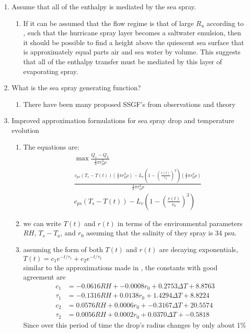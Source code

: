 \documentclass[10pt,a4paper]{article}
\begin{document}
 \renewcommand{\theenumi}{\Roman{enumi}}
 \renewcommand{\theenumii}{\arabic{enumii}}
 \renewcommand{\theenumiii}{\alpha{enumiii}}
 
 
\begin{enumerate}
\item
Assume that all of the enthalpy is mediated by the sea spray.
\begin{enumerate}
\item 
If it can be assumed that the flow regime is that of large $R_u$ according to \citet{Emanuel2003}, such that the hurricane spray layer becomes a saltwater emulsion, then it should be possible to find a height above the quiescent sea surface that is approximately equal parts air and sea water by volume. This suggests that all of the enthalpy transfer must be mediated by this layer of evaporating spray. 
\end{enumerate}
\item 
What is the sea spray generating function?
\begin{enumerate}
\item
There have been many proposed SSGF's from observations and theory
\end{enumerate}
\item 
Improved approximation formulations for sea spray drop and temperature evolution
\begin{enumerate}
\item The equations are:
\begin{align*}
&\max \frac{Q_s-Q_L}{\frac{4}{3}\pi r_0^3 \rho}\\
&\frac{c_{ps} (T_s-T(t))\left( \frac{4}{3}\pi r_0^3 \rho\right)-L_v \left(1-\left(\frac{r(t)}{r_0}\right)^3\right)\left( \frac{4}{3}\pi r_0^3 \rho\right)}{\frac{4}{3}\pi r_0^3 \rho}\\
&c_{ps} (T_s-T(t))-L_v \left(1-\left(\frac{r(t)}{r_0}\right)^3\right)
\end{align*}
\item we can write $T(t)$ and $r(t)$ in terms of the environmental parameters $RH$, $T_s-T_a$, and $r_0$ assuming that the salinity of they spray is 34 psu.
\item assuming the form of both $T(t)$ and $r(t)$ are decaying exponentials, \\
$T(t) = c_1e^{-t/\tau_1}+c_2e^{-t/\tau_2}$\\
similar to the approximations made in \citet{Andreas2005}, the constants with good agreement are
\begin{align}
 c_1 &=   -0.0616 RH  + -0.0008 r_0  + 0.2753 \Delta T +   8.8763\\
 \tau_1 &=   -0.1316 RH  +    0.0138 r_0  +    1.4294 \Delta T +    8.8224\\
 c_2 &=    0.0576 RH  +    0.0006 r_0  +   -0.3167 \Delta T +   20.5574\\
 \tau_2 &=     0.0056 RH  +    0.0002 r_0  +    0.0370 \Delta T +  -0.5818
\end{align}
Since over this period of time the drop's radius changes by only about 1\% 


\end{enumerate}
\end{enumerate}
\end{document}
